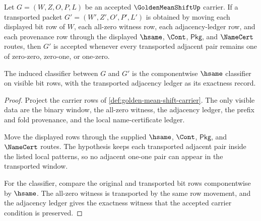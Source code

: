 \begin{theorem}
\label{thm:golden-mean-shift-local-stability}
Let $G=(W,Z,O,P,L)$ be an accepted $\GoldenMeanShiftUp$ carrier. If a transported packet $G'=(W',Z',O',P',L')$ is obtained by moving each displayed bit row of $W$, each all-zero witness row, each adjacency-ledger row, and each provenance row through the displayed $\hsame$, $\Cont$, $\mathsf{Pkg}$, and $\NameCert$ routes, then $G'$ is accepted whenever every transported adjacent pair remains one of zero-zero, zero-one, or one-zero.

The induced classifier between $G$ and $G'$ is the componentwise $\hsame$ classifier on visible bit rows, with the transported adjacency ledger as its exactness record.
\end{theorem}
\begin{proof}
Project the carrier rows of \autoref{def:golden-mean-shift-carrier}. The only visible data are the binary window, the all-zero witness, the adjacency ledger, the prefix and fold provenance, and the local name-certificate ledger.

Move the displayed rows through the supplied $\hsame$, $\Cont$, $\mathsf{Pkg}$, and $\NameCert$ routes. The hypothesis keeps each transported adjacent pair inside the listed local patterns, so no adjacent one-one pair can appear in the transported window.

For the classifier, compare the original and transported bit rows componentwise by $\hsame$. The all-zero witness is transported by the same row movement, and the adjacency ledger gives the exactness witness that the accepted carrier condition is preserved.
\end{proof}

